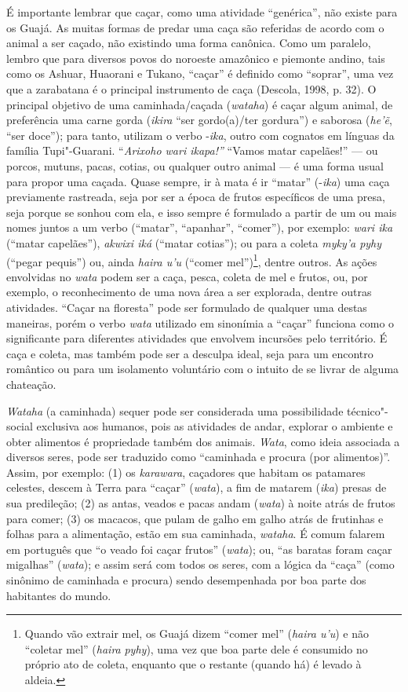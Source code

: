 É importante lembrar que caçar, como uma atividade ``genérica'', não
existe para os Guajá. As muitas formas de predar uma caça são referidas
de acordo com o animal a ser caçado, não existindo uma forma canônica.
Como um paralelo, lembro que para diversos povos do noroeste amazônico e
piemonte andino, tais como os Ashuar, Huaorani e Tukano, ``caçar'' é
definido como ``soprar'', uma vez que a zarabatana é o principal
instrumento de caça (Descola, 1998, p. 32). O principal objetivo de uma
caminhada/caçada (\emph{wataha}) é caçar algum animal, de preferência
uma carne gorda (\emph{ikira} ``ser gordo(a)/ter gordura'') e saborosa
(\emph{he'ẽ}, ``ser doce''); para tanto, utilizam o verbo -\emph{ika},
outro com cognatos em línguas da família Tupi"-Guarani. ``\emph{Arixoho
wari ikapa!''} ``Vamos matar capelães!'' --- ou porcos, mutuns, pacas,
cotias, ou qualquer outro animal --- é uma forma usual para propor uma
caçada. Quase sempre, ir à mata é ir ``matar'' (-\emph{ika}) uma caça
previamente rastreada, seja por ser a época de frutos específicos de uma
presa, seja porque se sonhou com ela, e isso sempre é formulado a partir
de um ou mais nomes juntos a um verbo (``matar'', ``apanhar'', ``comer''), por
exemplo: \emph{wari ika} (``matar capelães''), \emph{akwixi iká} (``matar
cotias''); ou para a coleta \emph{myky'a pyhy} (``pegar pequis'') ou, ainda
\emph{haira u'u} (``comer mel'')\footnote{Quando vão extrair mel, os Guajá
  dizem ``comer mel'' (\emph{haira u'u}) e não ``coletar mel'' (\emph{haira}
  \emph{pyhy}), uma vez que boa parte dele é consumido no próprio ato de
  coleta, enquanto que o restante (quando há) é levado à aldeia.},
dentre outros. As ações envolvidas no \emph{wata} podem ser a caça,
pesca, coleta de mel e frutos, ou, por exemplo, o reconhecimento de uma
nova área a ser explorada, dentre outras atividades. ``Caçar na floresta''
pode ser formulado de qualquer uma destas maneiras, porém o verbo
\emph{wata} utilizado em sinonímia a ``caçar'' funciona como o
significante para diferentes atividades que envolvem incursões pelo
território. É caça e coleta, mas também pode ser a desculpa ideal, seja
para um encontro romântico ou para um isolamento voluntário com o
intuito de se livrar de alguma chateação.

\emph{Wataha} (a caminhada) sequer pode ser considerada uma
possibilidade técnico"-social exclusiva aos humanos, pois as atividades
de andar, explorar o ambiente e obter alimentos é propriedade também dos
animais. \emph{Wata}, como ideia associada a diversos seres, pode ser
traduzido como ``caminhada e procura (por alimentos)''. Assim, por
exemplo: (1) os \emph{karawara}, caçadores que habitam os patamares
celestes, descem à Terra para ``caçar'' (\emph{wata}), a fim de matarem
(\emph{ika}) presas de sua predileção; (2) as antas, veados e pacas
andam (\emph{wata}) à noite atrás de frutos para comer; (3) os macacos,
que pulam de galho em galho atrás de frutinhas e folhas para a
alimentação, estão em sua caminhada, \emph{wataha}. É comum falarem em
português que ``o veado foi caçar frutos'' (\emph{wata}); ou, ``as
baratas foram caçar migalhas'' (\emph{wata}); e assim será com todos os
seres, com a lógica da ``caça'' (como sinônimo de caminhada e procura)
sendo desempenhada por boa parte dos habitantes do mundo.

